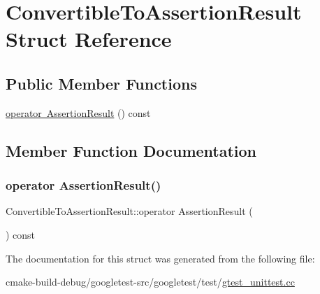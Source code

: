 \hypertarget{structConvertibleToAssertionResult}{}\section{Convertible\+To\+Assertion\+Result Struct Reference}
\label{structConvertibleToAssertionResult}
\subsection*{Public Member Functions}
\begin{DoxyCompactItemize}
\item 
\mbox{\hyperlink{structConvertibleToAssertionResult_a0f816f2f25ecaf29a95b3cfd4033e105}{operator Assertion\+Result}} () const
\end{DoxyCompactItemize}


\subsection{Member Function Documentation}
\mbox{\label{structConvertibleToAssertionResult_a0f816f2f25ecaf29a95b3cfd4033e105}} 
\subsubsection{\texorpdfstring{operator AssertionResult()}{operator AssertionResult()}}
{\footnotesize\ttfamily Convertible\+To\+Assertion\+Result\+::operator Assertion\+Result (\begin{DoxyParamCaption}{ }\end{DoxyParamCaption}) const\hspace{0.3cm}{\ttfamily [inline]}}



The documentation for this struct was generated from the following file\+:\begin{DoxyCompactItemize}
\item 
cmake-\/build-\/debug/googletest-\/src/googletest/test/\mbox{\hyperlink{gtest__unittest_8cc}{gtest\+\_\+unittest.\+cc}}\end{DoxyCompactItemize}
